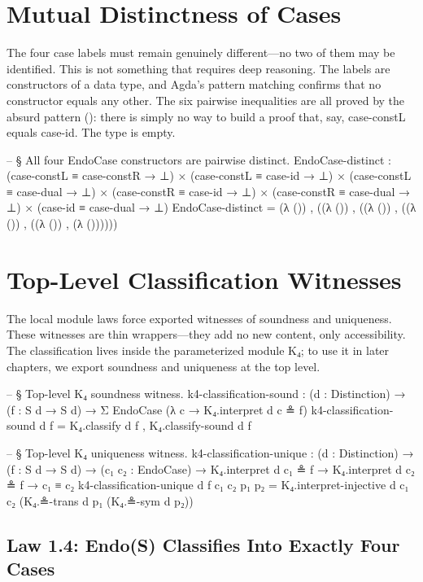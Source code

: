 \documentclass[11pt,a4paper]{book}
\def\texttt#1{#1}%
\begin{document}
\section{Mutual Distinctness of Cases}

The four case labels must remain genuinely different—no two of them may be identified. This is not something that requires deep reasoning. The labels are constructors of a data type, and Agda's pattern matching confirms that no constructor equals any other. The six pairwise inequalities are all proved by the absurd pattern \texttt{()}: there is simply no way to build a proof that, say, \texttt{case-constL} equals \texttt{case-id}. The type is empty.

\begin{code}
-- § All four EndoCase constructors are pairwise distinct.
EndoCase-distinct :
  (case-constL ≡ case-constR → ⊥) ×
  (case-constL ≡ case-id     → ⊥) ×
  (case-constL ≡ case-dual   → ⊥) ×
  (case-constR ≡ case-id     → ⊥) ×
  (case-constR ≡ case-dual   → ⊥) ×
  (case-id     ≡ case-dual   → ⊥)
EndoCase-distinct =
  (λ ()) ,
  ((λ ()) ,
   ((λ ()) ,
    ((λ ()) ,
     ((λ ()) ,
      (λ ())))))
\end{code}

\section{Top-Level Classification Witnesses}

The local module laws force exported witnesses of soundness and uniqueness.
These witnesses are thin wrappers—they add no new content, only accessibility.
The classification lives inside the parameterized module \texttt{K₄}; to use it in later chapters, we export soundness and uniqueness at the top level.

\begin{code}
-- § Top-level K₄ soundness witness.
k4-classification-sound :
  (d : Distinction) →
  (f : S d → S d) →
  Σ EndoCase (λ c → K₄.interpret d c ≗ f)
k4-classification-sound d f = K₄.classify d f , K₄.classify-sound d f

-- § Top-level K₄ uniqueness witness.
k4-classification-unique :
  (d : Distinction) →
  (f : S d → S d) →
  (c₁ c₂ : EndoCase) →
  K₄.interpret d c₁ ≗ f →
  K₄.interpret d c₂ ≗ f →
  c₁ ≡ c₂
k4-classification-unique d f c₁ c₂ p₁ p₂ =
  K₄.interpret-injective d c₁ c₂ (K₄.≗-trans d p₁ (K₄.≗-sym d p₂))
\end{code}

\subsection{Law 1.4: Endo(S) Classifies Into Exactly Four Cases}
\end{document}
